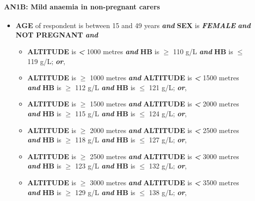 \documentclass[12pt,a4paper]{article}
\let\oldparagraph\paragraph
\renewcommand{\paragraph}[1]{\oldparagraph{#1}\mbox{}}
\begin{document}
\newpage

\hypertarget{an1b-mild-anaemia-in-non-pregnant-carers}{%
\paragraph{AN1B: Mild anaemia in non-pregnant carers}\label{an1b-mild-anaemia-in-non-pregnant-carers}}

\begin{itemize}
\item
  \textbf{AGE} of respondent is between 15 and 49 years \textbf{\emph{and}} \textbf{SEX} is \textbf{\emph{FEMALE}} \textbf{\emph{and}} \textbf{NOT PREGNANT} \textbf{\emph{and}}

  \begin{itemize}
  \item
    \textbf{ALTITUDE} is \textbf{\emph{\textless{}}} 1000 metres \textbf{\emph{and}} \textbf{HB} is \textbf{\emph{\(\geq\)}} 110 g/L \textbf{\emph{and}} \textbf{HB} is \textbf{\emph{\(\leq\)}} 119 g/L; \textbf{\emph{or}},
  \item
    \textbf{ALTITUDE} is \textbf{\emph{\(\geq\)}} 1000 metres \textbf{\emph{and}} \textbf{ALTITUDE} is \textbf{\emph{\textless{}}} 1500 metres \textbf{\emph{and}} \textbf{HB} is \textbf{\emph{\(\geq\)}} 112 g/L \textbf{\emph{and}} \textbf{HB} is \textbf{\emph{\(\leq\)}} 121 g/L; \textbf{\emph{or}},
  \item
    \textbf{ALTITUDE} is \textbf{\emph{\(\geq\)}} 1500 metres \textbf{\emph{and}} \textbf{ALTITUDE} is \textbf{\emph{\textless{}}} 2000 metres \textbf{\emph{and}} \textbf{HB} is \textbf{\emph{\(\geq\)}} 115 g/L \textbf{\emph{and}} \textbf{HB} is \textbf{\emph{\(\leq\)}} 124 g/L; \textbf{\emph{or}},
  \item
    \textbf{ALTITUDE} is \textbf{\emph{\(\geq\)}} 2000 metres \textbf{\emph{and}} \textbf{ALTITUDE} is \textbf{\emph{\textless{}}} 2500 metres \textbf{\emph{and}} \textbf{HB} is \textbf{\emph{\(\geq\)}} 118 g/L \textbf{\emph{and}} \textbf{HB} is \textbf{\emph{\(\leq\)}} 127 g/L; \textbf{\emph{or}},
  \item
    \textbf{ALTITUDE} is \textbf{\emph{\(\geq\)}} 2500 metres \textbf{\emph{and}} \textbf{ALTITUDE} is \textbf{\emph{\textless{}}} 3000 metres \textbf{\emph{and}} \textbf{HB} is \textbf{\emph{\(\geq\)}} 123 g/L \textbf{\emph{and}} \textbf{HB} is \textbf{\emph{\(\leq\)}} 132 g/L; \textbf{\emph{or}},
  \item
    \textbf{ALTITUDE} is \textbf{\emph{\(\geq\)}} 3000 metres \textbf{\emph{and}} \textbf{ALTITUDE} is \textbf{\emph{\textless{}}} 3500 metres \textbf{\emph{and}} \textbf{HB} is \textbf{\emph{\(\geq\)}} 129 g/L \textbf{\emph{and}} \textbf{HB} is \textbf{\emph{\(\leq\)}} 138 g/L; \textbf{\emph{or}},

\end{itemize}
\end{itemize}
\end{document}
